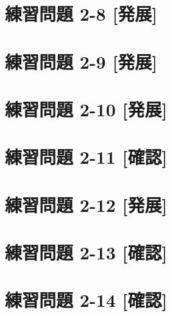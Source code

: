 \documentclass[
]{book}
\begin{document}
\hypertarget{ux7df4ux7fd2ux554fux984c-2-8-ux767aux5c55}{%
\section*{練習問題 2-8 {[}発展{]}}\label{ux7df4ux7fd2ux554fux984c-2-8-ux767aux5c55}}

\hypertarget{ux7df4ux7fd2ux554fux984c-2-9-ux767aux5c55}{%
\section*{練習問題 2-9 {[}発展{]}}\label{ux7df4ux7fd2ux554fux984c-2-9-ux767aux5c55}}

\hypertarget{ux7df4ux7fd2ux554fux984c-2-10-ux767aux5c55}{%
\section*{練習問題 2-10 {[}発展{]}}\label{ux7df4ux7fd2ux554fux984c-2-10-ux767aux5c55}}

\hypertarget{ux7df4ux7fd2ux554fux984c-2-11-ux78baux8a8d}{%
\section*{練習問題 2-11 {[}確認{]}}\label{ux7df4ux7fd2ux554fux984c-2-11-ux78baux8a8d}}

\hypertarget{ux7df4ux7fd2ux554fux984c-2-12-ux767aux5c55}{%
\section*{練習問題 2-12 {[}発展{]}}\label{ux7df4ux7fd2ux554fux984c-2-12-ux767aux5c55}}

\hypertarget{ux7df4ux7fd2ux554fux984c-2-13-ux78baux8a8d}{%
\section*{練習問題 2-13 {[}確認{]}}\label{ux7df4ux7fd2ux554fux984c-2-13-ux78baux8a8d}}

\hypertarget{ux7df4ux7fd2ux554fux984c-2-14-ux78baux8a8d}{%
\section*{練習問題 2-14 {[}確認{]}}\label{ux7df4ux7fd2ux554fux984c-2-14-ux78baux8a8d}}
\end{document}
